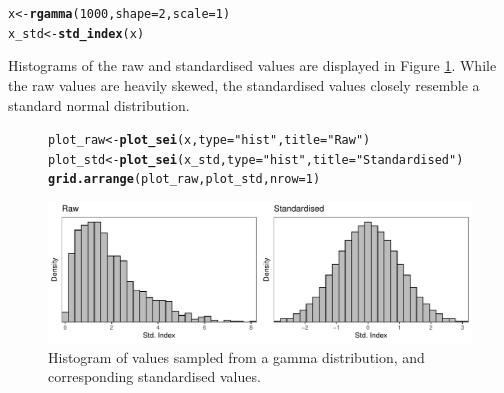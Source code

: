 \documentclass[article,shortnames,nojss]{jss}\usepackage[]{graphicx}\usepackage[]{xcolor}
\makeatletter
\newcommand{\hlnum}[1]{\textcolor[rgb]{0.686,0.059,0.569}{#1}}%
\newcommand{\hlstr}[1]{\textcolor[rgb]{0.192,0.494,0.8}{#1}}%
\newcommand{\hlstd}[1]{\textcolor[rgb]{0.345,0.345,0.345}{#1}}%
\newcommand{\hlkwb}[1]{\textcolor[rgb]{0.69,0.353,0.396}{#1}}%
\newcommand{\hlkwc}[1]{\textcolor[rgb]{0.333,0.667,0.333}{#1}}%
\newcommand{\hlkwd}[1]{\textcolor[rgb]{0.737,0.353,0.396}{\textbf{#1}}}%
\newenvironment{kframe}{%
 \def\at@end@of@kframe{}%
 \ifinner\ifhmode%
  \def\at@end@of@kframe{\end{minipage}}%
  \begin{minipage}{\columnwidth}%
 \fi\fi%
 \def\FrameCommand##1{\hskip\@totalleftmargin \hskip-\fboxsep
 \colorbox{shadecolor}{##1}\hskip-\fboxsep
     \hskip-\linewidth \hskip-\@totalleftmargin \hskip\columnwidth}%
 \MakeFramed {\advance\hsize-\width
   \@totalleftmargin\z@ \linewidth\hsize
   \@setminipage}}%
 {\par\unskip\endMakeFramed%
 \at@end@of@kframe}
\newenvironment{knitrout}{}{} %
\makeatother
\begin{document}
\begin{knitrout}
\color{fgcolor}\begin{kframe}
\begin{alltt}
\hlstd{x} \hlkwb{<-} \hlkwd{rgamma}\hlstd{(}\hlnum{1000}\hlstd{,} \hlkwc{shape} \hlstd{=} \hlnum{2}\hlstd{,} \hlkwc{scale} \hlstd{=} \hlnum{1}\hlstd{)}
\hlstd{x_std} \hlkwb{<-} \hlkwd{std_index}\hlstd{(x)}
\end{alltt}
\end{kframe}
\end{knitrout}

Histograms of the raw and standardised values are displayed in Figure \ref{fig:hist_ex}. While the raw values are heavily skewed, the standardised values closely resemble a standard normal distribution.

\begin{figure}
\begin{knitrout}
\color{fgcolor}\begin{kframe}
\begin{alltt}
\hlstd{plot_raw} \hlkwb{<-} \hlkwd{plot_sei}\hlstd{(x,} \hlkwc{type} \hlstd{=} \hlstr{"hist"}\hlstd{,} \hlkwc{title} \hlstd{=} \hlstr{"Raw"}\hlstd{)}
\hlstd{plot_std} \hlkwb{<-} \hlkwd{plot_sei}\hlstd{(x_std,} \hlkwc{type} \hlstd{=} \hlstr{"hist"}\hlstd{,} \hlkwc{title} \hlstd{=} \hlstr{"Standardised"}\hlstd{)}
\hlkwd{grid.arrange}\hlstd{(plot_raw, plot_std,} \hlkwc{nrow} \hlstd{=} \hlnum{1}\hlstd{)}
\end{alltt}
\end{kframe}

{\centering \includegraphics[width=\linewidth]{figure/std_index_ex_plot-1} 

}


\end{knitrout}
\caption{Histogram of values sampled from a gamma distribution, and corresponding standardised values.}
\label{fig:hist_ex}
\end{figure}
\end{document}
